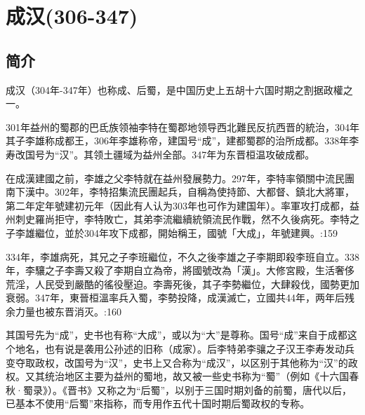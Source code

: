 

\section{成汉\tiny(306-347)}

\subsection{简介}

成汉（304年-347年）也称成、后蜀，是中国历史上五胡十六国时期之割据政權之一。

301年益州的蜀郡的巴氐族领袖李特在蜀郡地领导西北難民反抗西晋的統治，304年其子李雄称成都王，306年李雄称帝，建国号“成”，建都蜀郡的治所成都。338年李寿改国号为“汉”。其领土疆域为益州全部。347年为东晋桓温攻破成都。

在成漢建國之前，李雄之父李特就在益州發展勢力。297年，李特率領關中流民團南下漢中。302年，李特招集流民團起兵，自稱為使持節、大都督、鎮北大將軍，第二年定年號建初元年（因此有人认为303年也可作为建国年）。率軍攻打成都，益州刺史羅尚拒守，李特敗亡，其弟李流繼續統領流民作戰，然不久後病死。李特之子李雄繼位，並於304年攻下成都，開始稱王，國號「大成」，年號建興。:159

334年，李雄病死，其兄之子李班繼位，不久之後李雄之子李期即殺李班自立。338年，李驤之子李壽又殺了李期自立為帝，將國號改為「漢」。大修宮殿，生活奢侈荒淫，人民受到嚴酷的徭役壓迫。李壽死後，其子李勢繼位，大肆殺伐，國勢更加衰弱。347年，東晉桓溫率兵入蜀，李勢投降，成漢滅亡，立國共44年，两年后残余力量也被东晋消灭。:160

其国号先为“成”，史书也有称“大成”，或以为“大”是尊称。国号“成”来自于成都这个地名，也有说是袭用公孙述的旧称（成家）。后李特弟李骧之子汉王李寿发动兵变夺取政权，改国号为“汉”，史书上又合称为“成汉”，以区别于其他称为“汉”的政权。又其统治地区主要为益州的蜀地，故又被一些史书称为“蜀”（例如《十六国春秋·蜀录》）。《晋书》又称之为“后蜀”，以别于三国时期刘备的前蜀，唐代以后，已基本不使用“后蜀”來指称，而专用作五代十国时期后蜀政权的专称。








